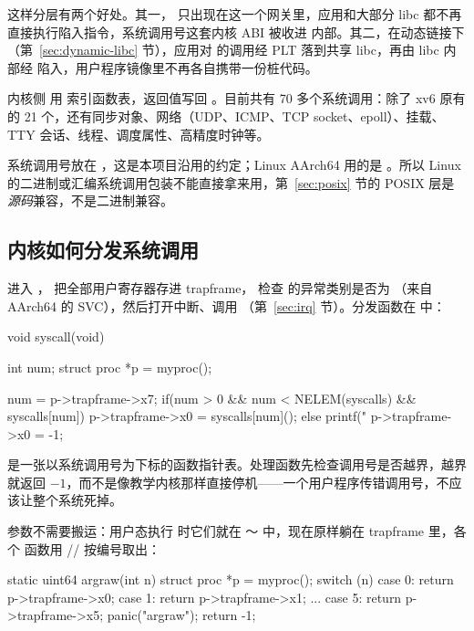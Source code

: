 这样分层有两个好处。其一， 只出现在这一个网关里，应用和大部分 libc 都不再直接执行陷入指令，系统调用号这套内核 ABI 被收进  内部。其二，在动态链接下（第~\ref{sec:dynamic-libc} 节），应用对  的调用经 PLT 落到共享 libc，再由 libc 内部经  陷入，用户程序镜像里不再各自携带一份桩代码。

内核侧  用  索引函数表，返回值写回 。目前共有 70 多个系统调用：除了 xv6 原有的 21 个，还有同步对象、网络（UDP、ICMP、TCP socket、epoll）、挂载、TTY 会话、线程、调度属性、高精度时钟等。

\begin{note}
  系统调用号放在 ，这是本项目沿用的约定；Linux AArch64 用的是 。所以 Linux 的二进制或汇编系统调用包装不能直接拿来用，第~\ref{sec:posix} 节的 POSIX 层是\emph{源码}兼容，不是二进制兼容。
\end{note}

\subsection{内核如何分发系统调用}
\label{sec:syscall-dispatch}

 进入 ， 把全部用户寄存器存进 trapframe， 检查  的异常类别是否为 （来自 AArch64 的 SVC），然后打开中断、调用 （第~\ref{sec:irq} 节）。分发函数在  中：

\begin{ccode}
void syscall(void)
{
  int num;
  struct proc *p = myproc();

  num = p->trapframe->x7;
  if(num > 0 && num < NELEM(syscalls) && syscalls[num]) {
    p->trapframe->x0 = syscalls[num]();
  } else {
    printf("%
    p->trapframe->x0 = -1;
  }
}
\end{ccode}

 是一张以系统调用号为下标的函数指针表。处理函数先检查调用号是否越界，越界就返回 $-1$，而不是像教学内核那样直接停机——一个用户程序传错调用号，不应该让整个系统死掉。

参数不需要搬运：用户态执行  时它们就在 ～ 中，现在原样躺在 trapframe 里，各个  函数用 // 按编号取出：

\begin{ccode}
static uint64 argraw(int n)
{
  struct proc *p = myproc();
  switch (n) {
  case 0: return p->trapframe->x0;
  case 1: return p->trapframe->x1;
  ...
  case 5: return p->trapframe->x5;
  }
  panic("argraw");
  return -1;
}
\end{ccode}

